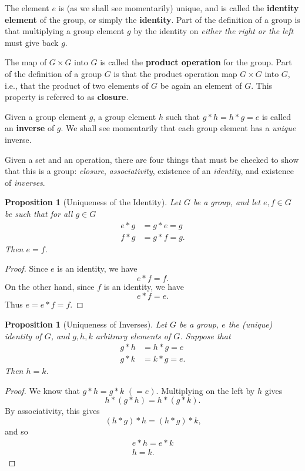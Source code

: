 \documentclass[12pt]{amsbook}
\theoremstyle{plain}
\newtheorem{proposition}[theorem]{Proposition}
\numberwithin{equation}{chapter}
\numberwithin{theorem}{chapter}
\begin{document}
The element $e$ is (as we shall see momentarily) unique, and is called the
\textbf{identity element} of the group, or simply the \textbf{identity}. Part
of the definition of a group is that multiplying a group element $g$ by the
identity on \textit{either the right or the left} must give back $g$.

The map of $G\times G$ into $G$ is called the \textbf{product operation} for
the group. Part of the definition of a group $G$ is that the product operation
map $G\times G$ into $G$, i.e., that the product of two elements of $G$ be
again an element of $G$. This property is referred to as \textbf{closure}.

Given a group element $g$, a group element $h$ such that $g*h=h*g=e$ is called
an \textbf{inverse} of $g$. We shall see momentarily that each group element
has a \textit{unique} inverse.

Given a set and an operation, there are four things that must be checked to
show that this is a group: \textit{closure}, \textit{associativity}, existence
of an \textit{identity}, and existence of \textit{inverses}.

\begin{proposition}
[Uniqueness of the Identity]Let $G$ be a group, and let $e,f\in G$ be such
that for all $g\in G$%
\begin{align*}
e\ast g  & =g\ast e=g\\
f\ast g  & =g\ast f=g\text{.}%
\end{align*}
Then $e=f$.
\end{proposition}

\begin{proof}
Since $e$ is an identity, we have
\[
e\ast f=f\text{.}%
\]
On the other hand, since $f$ is an identity, we have
\[
e\ast f=e\text{.}%
\]
Thus $e=e\ast f=f$.
\end{proof}

\begin{proposition}
[Uniqueness of Inverses]Let $G$ be a group, $e$ the (unique) identity of $G$,
and $g,h,k$ arbitrary elements of $G$. Suppose that
\begin{align*}
g\ast h  & =h\ast g=e\\
g\ast k  & =k\ast g=e.
\end{align*}
Then $h=k$.
\end{proposition}

\begin{proof}
We know that $g\ast h=g\ast k$ $(=e)$. Multiplying on the left by $h$ gives
\[
h\ast(g\ast h)=h\ast(g\ast k)\text{.}%
\]
By associativity, this gives
\[
(h\ast g)\ast h=(h\ast g)\ast k\text{,}%
\]
and so
\begin{align*}
e\ast h=e\ast k\\
h=k\text{.}%
\end{align*}
\end{proof}
\end{document}
